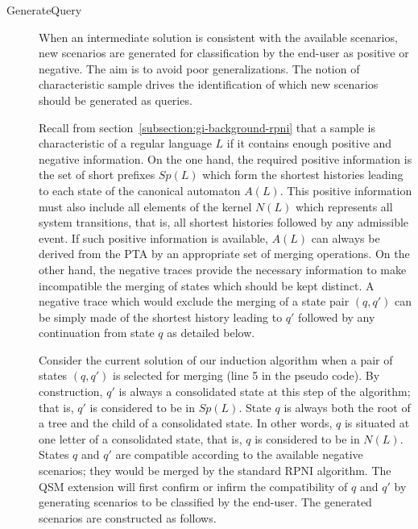 \begin{description}

\item[GenerateQuery] When an intermediate solution is consistent with the available scenarios, new scenarios are generated for classification by the end-user as positive or negative. The aim is to avoid poor generalizations. The notion of characteristic sample drives the identification of which new scenarios should be generated as queries. 

Recall from section~\ref{subsection:gi-background-rpni} that a sample is characteristic of a regular language $L$ if it contains enough positive and negative information. On the one hand, the required positive information is the set of short prefixes $Sp(L)$ which form the shortest histories leading to each state of the canonical automaton $A(L)$. This positive information must also include all elements of the kernel $N(L)$ which represents all system transitions, that is, all shortest histories followed by any admissible event. If such positive information is available, $A(L)$ can always be derived from the PTA by an appropriate set of merging operations. On the other hand, the negative traces provide the necessary information to make incompatible the merging of states which should be kept distinct. A negative trace which would exclude the merging of a state pair $(q, q')$ can be simply made of the shortest history leading to $q'$ followed by any continuation from state $q$ as detailed below.

Consider the current solution of our induction algorithm when a pair of states $(q, q')$ is selected for merging (line 5 in the pseudo code). By construction, $q'$ is always a consolidated state at this step of the algorithm; that is, $q'$ is considered to be in $Sp(L)$. State $q$ is always both the root of a tree and the child of a consolidated state. In other words, $q$ is situated at one letter of a consolidated state, that is, $q$ is considered to be in $N(L)$. States $q$ and $q'$ are compatible according to the available negative scenarios; they would be merged by the standard RPNI algorithm. The QSM extension will first confirm or infirm the compatibility of $q$ and $q'$ by generating scenarios to be classified by the end-user. The generated scenarios are constructed as follows.


\end{description}
